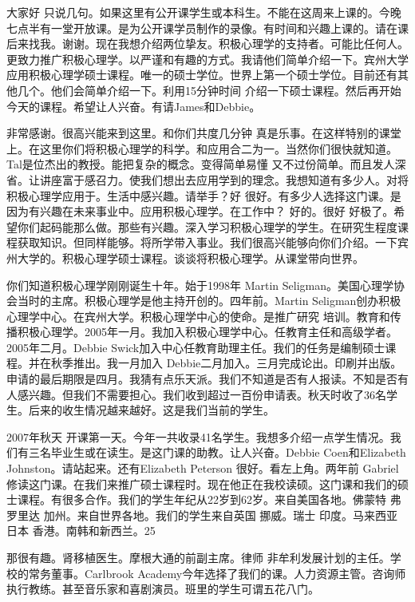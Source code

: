 大家好 只说几句。如果这里有公开课学生或本科生。不能在这周来上课的。今晚七点半有一堂开放课。是为公开课学员制作的录像。有时间和兴趣上课的。请在课后来找我。谢谢。现在我想介绍两位挚友。积极心理学的支持者。可能比任何人。更致力推广积极心理学。以严谨和有趣的方式。我请他们简单介绍一下。宾州大学应用积极心理学硕士课程。唯一的硕士学位。世界上第一个硕士学位。目前还有其他几个。他们会简单介绍一下。利用15分钟时间 介绍一下硕士课程。然后再开始今天的课程。希望让人兴奋。有请James和Debbie。 

非常感谢。很高兴能来到这里。和你们共度几分钟 真是乐事。在这样特别的课堂上。在这里你们将积极心理学的科学。和应用合二为一。当然你们很快就知道。Tal是位杰出的教授。能把复杂的概念。变得简单易懂 又不过份简单。而且发人深省。让讲座富于感召力。使我们想出去应用学到的理念。我想知道有多少人。对将积极心理学应用于。生活中感兴趣。请举手？好 很好。有多少人选择这门课。是因为有兴趣在未来事业中。应用积极心理学。在工作中？ 好的。很好 好极了。希望你们起码能那么做。那些有兴趣。深入学习积极心理学的学生。在研究生程度课程获取知识。但同样能够。将所学带入事业。我们很高兴能够向你们介绍。一下宾州大学的。积极心理学硕士课程。谈谈将积极心理学。从课堂带向世界。 

你们知道积极心理学刚刚诞生十年。始于1998年 Martin Seligman。美国心理学协会当时的主席。积极心理学是他主持开创的。四年前。Martin Seligman创办积极心理学中心。在宾州大学。积极心理学中心的使命。是推广研究 培训。教育和传播积极心理学。2005年一月。我加入积极心理学中心。任教育主任和高级学者。2005年二月。Debbie Swick加入中心任教育助理主任。我们的任务是编制硕士课程。并在秋季推出。我一月加入 Debbie二月加入。三月完成论出。印刷并出版。申请的最后期限是四月。我猜有点乐天派。我们不知道是否有人报读。不知是否有人感兴趣。但我们不需要担心。我们收到超过一百份申请表。秋天时收了36名学生。后来的收生情况越来越好。这是我们当前的学生。 

2007年秋天 开课第一天。今年一共收录41名学生。我想多介绍一点学生情况。我们有三名毕业生或在读生。是这门课的助教。让人兴奋。Debbie Coen和Elizabeth Johnston。请站起来。还有Elizabeth Peterson 很好。看左上角。两年前 Gabriel修读这门课。在我们来推广硕士课程时。现在他正在我校读硕。这门课和我们的硕士课程。有很多合作。我们的学生年纪从22岁到62岁。来自美国各地。佛蒙特 弗罗里达 加州。来自世界各地。我们的学生来自英国 挪威。瑞士 印度。马来西亚 日本 香港。南韩和新西兰。25%

那很有趣。肾移植医生。摩根大通的前副主席。律师 非牟利发展计划的主任。学校的常务董事。Carlbrook Academy今年选择了我们的课。人力资源主管。咨询师 执行教练。甚至音乐家和喜剧演员。班里的学生可谓五花八门。 

